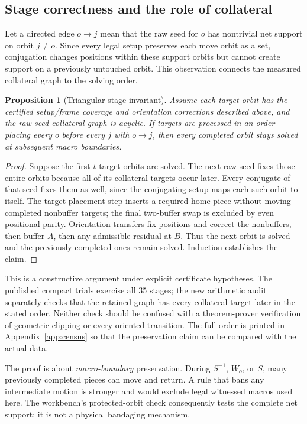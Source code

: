 \documentclass[a4paper,11pt]{article}
\newtheorem{proposition}{Proposition}[section]
\begin{document}
\subsection{Stage correctness and the role of collateral}

Let a directed edge \(o\to j\) mean that the raw seed for \(o\) has nontrivial net support on orbit \(j\ne o\). Since every legal setup preserves each move orbit as a set, conjugation changes positions within these support orbits but cannot create support on a previously untouched orbit. This observation connects the measured collateral graph to the solving order.

\begin{proposition}[Triangular stage invariant]
Assume each target orbit has the certified setup/frame coverage and orientation corrections described above, and the raw-seed collateral graph is acyclic. If targets are processed in an order placing every \(o\) before every \(j\) with \(o\to j\), then every completed orbit stays solved at subsequent macro boundaries.
\end{proposition}
\begin{proof}
Suppose the first \(t\) target orbits are solved. The next raw seed fixes those entire orbits because all of its collateral targets occur later. Every conjugate of that seed fixes them as well, since the conjugating setup maps each such orbit to itself. The target placement step inserts a required home piece without moving completed nonbuffer targets; the final two-buffer swap is excluded by even positional parity. Orientation transfers fix positions and correct the nonbuffers, then buffer \(A\), then any admissible residual at \(B\). Thus the next orbit is solved and the previously completed ones remain solved. Induction establishes the claim.
\end{proof}

This is a constructive argument under explicit certificate hypotheses. The published compact trials exercise all 35 stages; the new arithmetic audit separately checks that the retained graph has every collateral target later in the stated order. Neither check should be confused with a theorem-prover verification of geometric clipping or every oriented transition. The full order is printed in Appendix~\ref{app:census} so that the preservation claim can be compared with the actual data.

The proof is about \emph{macro-boundary} preservation. During \(S^{-1}\), \(W_o\), or \(S\), many previously completed pieces can move and return. A rule that bans any intermediate motion is stronger and would exclude legal witnessed macros used here. The workbench's protected-orbit check consequently tests the complete net support; it is not a physical bandaging mechanism.
\end{document}

